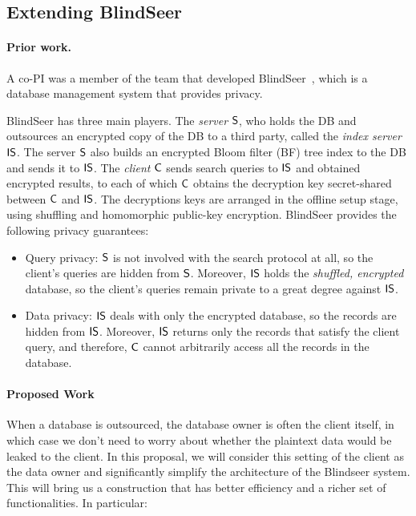 
\subsection{Extending BlindSeer}
\label{sec:ext-blindseer}

\paragraph{Prior work.} A co-PI was a member of the team that developed
BlindSeer~\cite{SP:PKVKMC14,SP:FVKKKM15}, which is a database management system
that provides privacy.

BlindSeer has three main players. The {\em server} $\sf S$,
who holds the DB and outsources an encrypted copy of the DB to a third party,
called the {\em index server} $\sf IS$. The server $\sf S$  also builds an
encrypted Bloom filter (BF) tree index to the DB and sends it to $\sf IS$. The
{\em client} $\sf C$ sends search queries to $\sf IS$ and obtained encrypted
results, to each of which $\sf C$ obtains the decryption key secret-shared
between $\sf C$ and $\sf IS$. The decryptions keys are arranged in the offline
setup stage, using shuffling and homomorphic public-key
encryption.
%
BlindSeer provides the following privacy guarantees:
\begin{itemize}\setlength\itemsep{0em}
\item Query privacy: $\sf S$ is not involved with the search protocol at
  all, so the client's queries are hidden from $\sf S$. Moreover, $\sf IS$ holds
    the {\em shuffled, encrypted} database, so the client's queries remain
    private to a great degree against $\sf IS$. 

\item Data privacy: $\sf IS$ deals with only the encrypted database, so the
records are hidden from $\sf IS$. Moreover, $\sf IS$ returns only the records
that satisfy the client query, and therefore, $\sf C$ cannot arbitrarily access
all the records in the database.  
\end{itemize}

\paragraph{Proposed Work}
When a database is outsourced, the database owner is often the client
itself, in which case we don't need to worry about whether the plaintext data
would be leaked to the client.  In this proposal, we will consider this setting
of the client as the data owner and significantly simplify the architecture of
the Blindseer system. This will bring us a construction that has better
efficiency and a richer set of functionalities. In particular:

